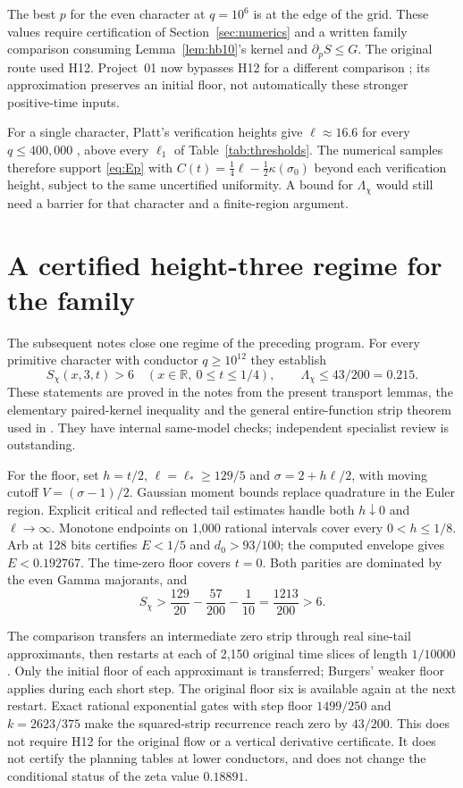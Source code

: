 \documentclass[11pt]{article}
\theoremstyle{definition}
\theoremstyle{remark}
\numberwithin{equation}{section}
\begin{document}
The best $p$ for the even character at $q=10^6$ is at the edge of the grid.
These values require certification of Section~\ref{sec:numerics} and a
written family comparison consuming Lemma~\ref{lem:hb10}'s kernel and
$\partial_pS\le G$. The original route used H12. Project~01 now bypasses
H12 for a different comparison \cite{p01r3}; its approximation preserves
an initial floor, not automatically these stronger positive-time inputs.

For a single character, Platt's verification heights \cite{platt2016} give
$\ell\approx16.6$ for every $q\le400{,}000$ \cite[Section~4.1]{p01}, above
every $\ell_1$ of Table~\ref{tab:thresholds}. The numerical samples therefore support
\eqref{eq:Ep} with $C(t)=\frac14\ell-\frac12\kappa(\sigma_0)$ beyond
each verification height, subject to the same uncertified uniformity. A bound for $\Lambda_\chi$
would still need a barrier for that character and a finite-region argument.

\section{A certified height-three regime for the family}\label{sec:roundtwo}

The subsequent notes \cite{r2floor,r2consumer} close one regime of the
preceding program. For every primitive character with conductor
$q\ge10^{12}$ they establish
\[
 S_\chi(x,3,t)>6\quad(x\in\mathbb R,\ 0\le t\le1/4),
 \qquad \Lambda_\chi\le43/200=0.215.
\]
These statements are proved in the notes from the present transport
lemmas, the elementary paired-kernel inequality and the general
entire-function strip theorem used in \cite{p01r3}. They have internal
same-model checks; independent specialist review is outstanding.

For the floor, set $h=t/2$, $\ell=\ell_*\ge129/5$ and
$\sigma=2+h\ell/2$, with moving cutoff $V=(\sigma-1)/2$.
Gaussian moment bounds replace quadrature in the Euler region.
Explicit critical and reflected tail estimates handle both $h\downarrow0$
and $\ell\to\infty$. Monotone endpoints on 1,000 rational intervals
cover every $0<h\le1/8$. Arb at 128 bits certifies
$E<1/5$ and $d_0>93/100$; the computed envelope gives $E<0.192767$.
The time-zero floor covers $t=0$. Both parities are dominated by the
even Gamma majorants, and
\[
 S_\chi>\frac{129}{20}-\frac{57}{200}-\frac1{10}
 =\frac{1213}{200}>6.
\]

The comparison transfers an intermediate zero strip through real
sine-tail approximants, then restarts at each of 2,150 original time
slices of length $1/10000$. Only the initial floor of each approximant
is transferred; Burgers' weaker floor applies during each short step.
The original floor six is available again at the next restart. Exact
rational exponential gates with step floor $1499/250$ and
$k=2623/375$ make the squared-strip recurrence reach zero by $43/200$.
This does not require H12 for the original flow or a vertical derivative
certificate. It does not certify the planning tables at lower conductors,
and does not change the conditional status of the zeta value $0.18891$.
\end{document}
